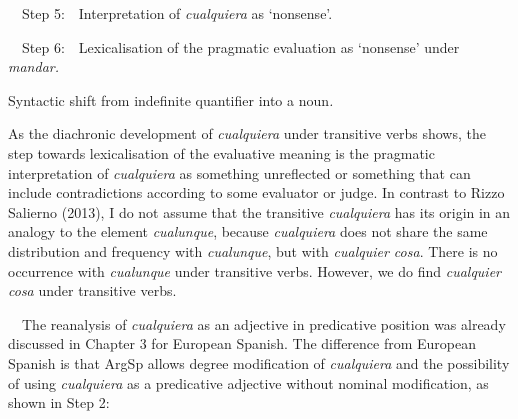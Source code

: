 \begin{styleStandard}
\ \ Step 5:\ \ Interpretation of \textit{cualquiera} as ‘nonsense’. 
\end{styleStandard}

\begin{styleStandard}
\ \ Step 6:\ \ Lexicalisation of the pragmatic evaluation as ‘nonsense’ under \textit{mandar. }
\end{styleStandard}

\begin{styleStandard}
Syntactic shift from indefinite quantifier into a noun\textit{.}
\end{styleStandard}

\begin{styleStandard}
As the diachronic development of \textit{cualquiera} under transitive verbs shows, the step towards lexicalisation of the evaluative meaning is the pragmatic interpretation of \textit{cualquiera} as something unreflected or something that can include contradictions according to some evaluator or judge. In contrast to Rizzo Salierno (2013), I do not assume that the transitive \textit{cualquiera} has its origin in an analogy to the element \textit{cualunque}, because \textit{cualquiera} does not share the same distribution and frequency with \textit{cualunque}, but with \textit{cualquier cosa}. There is no occurrence with \textit{cualunque} under transitive verbs. However, we do find \textit{cualquier cosa} under transitive verbs.
\end{styleStandard}

\begin{styleStandard}
\ \ The reanalysis of \textit{cualquiera} as an adjective in predicative position was already discussed in Chapter 3 for European Spanish. The difference from European Spanish is that ArgSp allows degree modification of \textit{cualquiera} and the possibility of using \textit{cualquiera} as a predicative adjective without nominal modification, as shown in Step 2:
\end{styleStandard}

